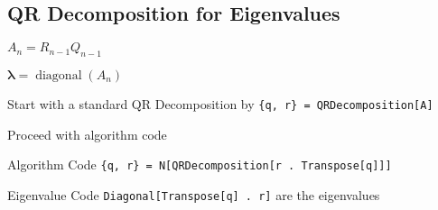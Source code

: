 \documentclass[10pt,letterpaper]{article}
\newenvironment{tight_item}
{\begin{itemize}
\setlength{\parskip}{0pt}
\setlength{\parsep}{0pt}
\setlength{\itemsep}{0pt}
\setlength{\parsep}{0pt}
\setlength{\topsep}{0pt}
\setlength{\partopsep}{0pt}
\setlength{\leftmargin}{0em}
\setlength{\labelwidth}{0em}
\setlength{\labelsep}{1em} }
{\end{itemize}}
\newenvironment{tight_enum}
{\begin{enumerate}
\setlength{\parskip}{0pt}
\setlength{\parsep}{0pt}
\setlength{\itemsep}{0pt}
\setlength{\parsep}{0pt}
\setlength{\topsep}{0pt}
\setlength{\partopsep}{0pt}
\setlength{\leftmargin}{0em}
\setlength{\labelwidth}{0em}
\setlength{\labelsep}{1em} }
{\end{enumerate}}
\newenvironment{tight_desc}
{\begin{description}
\setlength{\parskip}{0pt}
\setlength{\parsep}{0pt}
\setlength{\itemsep}{0pt}
\setlength{\parsep}{0pt}
\setlength{\topsep}{0pt}
\setlength{\partopsep}{0pt}
\setlength{\leftmargin}{0em}
\setlength{\labelwidth}{0em}
\setlength{\labelsep}{1em} }
{\end{description}}
\begin{document}
\begin{multicols*}{2}
\subsection{QR Decomposition for Eigenvalues}
\begin{tight_item}
\item $A_{n} = R_{n-1} Q_{n-1}$
\item $ \mathbf{\lambda} = \operatorname{diagonal}(A_{n})$
\end{tight_item}
\begin{tight_enum}
\item Start with a standard QR Decomposition by \texttt{\{q, r\} = QRDecomposition[A]}
\item Proceed with algorithm code
\end{tight_enum}
\begin{tight_desc}
\item[Algorithm Code]\texttt{\{q, r\} = N[QRDecomposition[r . Transpose[q]]]}
\item[Eigenvalue Code] \texttt{Diagonal[Transpose[q] . r]} are the eigenvalues
\end{tight_desc}

\end{multicols*}
\end{document}
